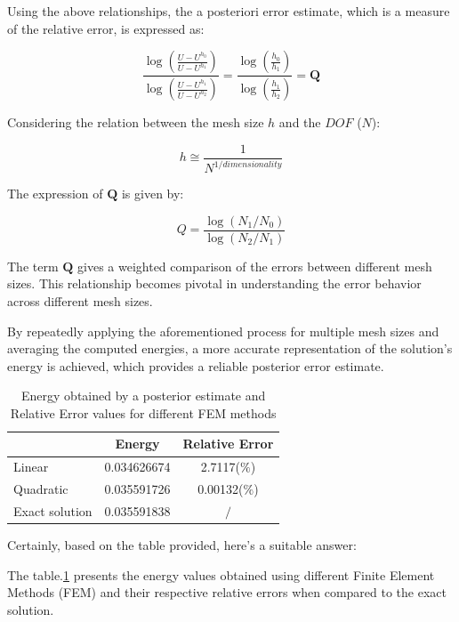 \documentclass[twoside,twocolumn,10pt]{article}
\begin{document}
Using the above relationships, the a posteriori error estimate, which is a measure of the relative error, is expressed as:

\begin{equation}
\frac{\log \left( \frac{U-U^{h_0}}{U-U^{h_1}} \right)}{\log \left( \frac{U-U^{h_1}}{U-U^{h_2}} \right)} = \frac{\log \left( \frac{h_0}{h_1} \right)}{\log \left( \frac{h_1}{h_2} \right)} = \textbf{Q}
\label{eq:Q_relation}
\end{equation}

Considering the relation between the mesh size $h$ and the $DOF$ ($N$):

\begin{equation}
 h \cong \frac{1}{N^{1 / dimensionality}}
\end{equation}

The expression of $\textbf{Q}$ is given by:

\begin{equation}
  Q=\frac{\log \left(N_1 / N_0\right)}{\log \left(N_2 / N_1\right)}
\end{equation}

The term \( \textbf{Q} \) gives a weighted comparison of the errors between different mesh sizes. This relationship becomes pivotal in understanding the error behavior across different mesh sizes.

By repeatedly applying the aforementioned process for multiple mesh sizes and averaging the computed energies, a more accurate representation of the solution's energy is achieved, which provides a reliable posterior error estimate.

\begin{table}[h]
  \centering
  \begin{tabular}{|l|c|c|}
      \hline
      & \textbf{Energy} & \textbf{Relative Error} \\
      \hline
      Linear & 0.034626674 & 2.7117($\%$) \\
      \hline
      Quadratic & 0.035591726 & 0.00132($\%$) \\
      \hline
      Exact solution & 0.035591838 & $/$ \\
      \hline
  \end{tabular}
  \caption{Energy obtained by a posterior estimate and Relative Error values for different FEM methods}
  \label{tab:fem_values}
\end{table}
Certainly, based on the table provided, here's a suitable answer:

The table.\ref{tab:fem_values} presents the energy values obtained using different Finite Element Methods (FEM) and their respective relative errors when compared to the exact solution. 
\end{document}

